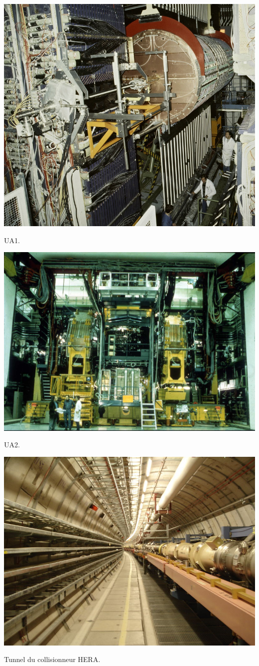 \marginpar
{
	\centering
	\includegraphics[width=\marginparwidth]{SM/ua1.jpg}
	\captionsetup{type=figure}\caption{UA1.}
	\label{UA1}
}
\marginpar
{
	\centering
	\includegraphics[width=\marginparwidth]{SM/ua2.jpg}
	\captionsetup{type=figure}\caption{UA2.}
	\label{UA2}
}
\marginpar
{
	\centering
	\includegraphics[width=\marginparwidth]{SM/HERA.jpg}
	\captionsetup{type=figure}\caption{Tunnel du collisionneur HERA.}
	\label{HERA}
}

